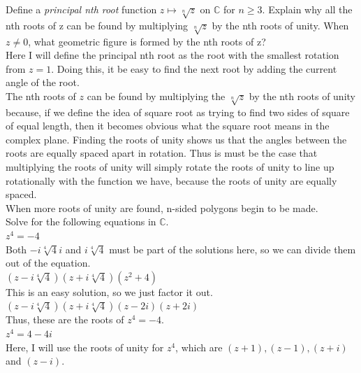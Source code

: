 \documentclass[12pt]{article}
\begin{document}
Define a \textit{principal nth root} function $z \mapsto \sqrt[n]{z}$ on $\mathbb{C}$ for $n \geq 3$. 
Explain why all the nth roots of z can be found by multiplying $\sqrt[n]{z}$ by the nth roots of unity. 
When $z \neq 0$, what geometric figure is formed by the nth roots of z?\\

Here I will define the principal nth root as the root with the smallest rotation from $z = 1$. 
Doing this, it be easy to find the next root by adding the current angle of the root.\\

The nth roots of $z$ can be found by multiplying the $\sqrt[n]{z}$ by the nth roots of unity because, if we define the idea of square root as trying to find two sides of square of equal length, then it becomes obvious what the square root means in the complex plane.
Finding the roots of unity shows us that the angles between the roots are equally spaced apart in rotation. Thus is must be the case that multiplying the roots of unity will simply rotate the roots of unity to line up rotationally with the function we have, because the roots of unity are equally spaced.\\

When more roots of unity are found, n-sided polygons begin to be made.\\

Solve for the following equations in $\mathbb{C}$.\\


 $z^4 = -4$ \\

Both $-i\sqrt[4]{4}i$ and $i\sqrt[4]{4}$ must be part of the solutions here, so we can divide them out of the equation.\\


$(z-i\sqrt[4]{4})(z+i\sqrt[4]{4})(z^2 + 4)$\\
This is an easy solution, so we just factor it out.\\

$(z-i\sqrt[4]{4})(z+i\sqrt[4]{4})(z-2i)(z+2i)$\\

Thus, these are the roots of $z^4 = -4$.\\


 $z^4 = 4 - 4i$\\

Here, I will use the roots of unity for $z^4$, which are $(z+1), (z-1), (z+i)$ and $(z-i)$.\\
\end{document}
